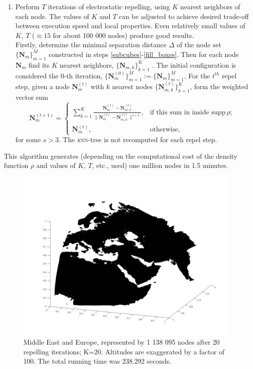 \documentclass[10pt]{amsart}
\begin{document}
\begin{enumerate}
	\item Perform $ T $ iterations of electrostatic repelling, using $ K $ nearest neighbors of each node. The values of $ K $ and $ T $ can be adjusted to achieve desired trade-off between execution speed and local properties. Even relatively small values of $ K,\ T $ ($ \approx 15 $ for about 100 000 nodes) produce good results. \\
	Firstly, determine the minimal separation distance $ \Delta $ of the node set $ \{\boldsymbol{N}_m\}_{m=1}^M $ constructed in steps \eqref{subcubes}-\eqref{fill_boxes}. Then for each node $ \boldsymbol{N}_m $ find its $ K $ nearest neighbors, $ \{\boldsymbol{N}_{m,k}\}_{k=1}^K $ . The initial configuration is considered the $ 0 $-th iteration, $ \{\boldsymbol{N}_m^{(0)}\}_{m=1}^M := \{\boldsymbol{N}_m\}_{m=1}^M $. For the $t^{th}$ repel step, given a node $\boldsymbol{N}_m^{(t)}$ with $ k $ nearest nodes $\{ \boldsymbol{N}_{m,k}^{(t)}\}_{k=1}^K$, form the weighted vector sum
	\[\boldsymbol{N}_m^{(t+1)} = \begin{cases}
	\sum_{k=1}^{K}\frac{\boldsymbol{N}_m^{(t)}-\boldsymbol{N}_{m,k}^{(t)} }{\|\boldsymbol{N}_m^{(t)}-\boldsymbol{N}_{m,k}^{(t)} \|^{s+1}}, &\text{if this sum in inside }\text{supp}\,\rho; \\
	\boldsymbol{N}_m^{(t)}, &\text{otherwise,}
	\end{cases} \]
	for some $s>3$.
	The \textsc{\textit{k}nn}-tree is not recomputed for each repel step.
\end{enumerate}
This algorithm generates (depending on the computational cost of the density function $ \rho $ and values of $ K,\  T$, etc., used) one million nodes in 1.5 minutes.

\begin{figure}
	\centering
	\includegraphics[width=\linewidth]{europe.png}
	\caption{Middle East and Europe, represented by 1 138 095 nodes after 20 repelling iterations; K=20. Altitudes are exaggerated by a factor of 100. The total running time was 238.292 seconds.}
	\label{europe}
\end{figure}
\end{document}
